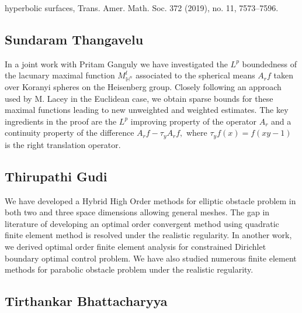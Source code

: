 hyperbolic surfaces, Trans. Amer. Math. Soc. 372 (2019), no. 11, 7573–7596.


\subsection{Sundaram Thangavelu}

In a joint work with Pritam Ganguly  we have investigated the $ L^p $  boundedness of the lacunary maximal function $ M_{\mathbb{H}^n}^l $ associated to the spherical means $ A_r f$  taken over Koranyi spheres on the Heisenberg group. Closely following an approach used by M. Lacey in the Euclidean case, we obtain sparse bounds for these maximal functions leading to new unweighted and weighted estimates. The key ingredients in the proof are the $L^p$  improving property of the operator $ A_r $  and a continuity property of the difference $ A_r f−\tau_y A_r f,$ where $\tau_yf(x)=f(xy−1) $ is the right translation operator.


\subsection{Thirupathi Gudi}

We have developed a Hybrid High Order methods for elliptic obstacle problem in both two and three space dimensions allowing general meshes. The gap in literature of developing an optimal order convergent method using quadratic finite element method is resolved under the realistic regularity. In another work, we derived optimal order finite element analysis for constrained Dirichlet boundary optimal control problem. We have also studied numerous finite element methods for parabolic obstacle problem under the realistic regularity.


\subsection{Tirthankar Bhattacharyya}

